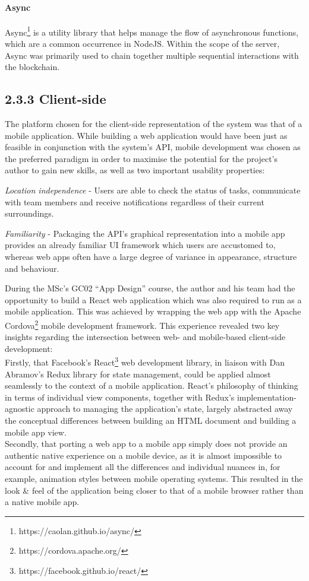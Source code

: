 \documentclass[12pt]{report}
\let\oldparagraph\paragraph
\renewcommand{\paragraph}[1]{\oldparagraph{#1}\mbox{}}
\begin{document}
\paragraph{Async}\label{async}

Async\footnote{https://caolan.github.io/async/} is a utility
library that helps manage the flow of asynchronous functions, which are
a common occurrence in NodeJS. Within the scope of the server, Async was
primarily used to chain together multiple sequential interactions with
the blockchain.

\subsection{2.3.3 Client-side}\label{client-side}

The platform chosen for the client-side representation of the system was
that of a mobile application. While building a web application would
have been just as feasible in conjunction with the system's API, mobile
development was chosen as the preferred paradigm in order to maximise
the potential for the project's author to gain new skills, as well as
two important usability properties:

\emph{Location independence} - Users are able to check the status of
tasks, communicate with team members and receive notifications
regardless of their current surroundings.

\emph{Familiarity} - Packaging the API's graphical representation into a
mobile app provides an already familiar UI framework which users are
accustomed to, whereas web apps often have a large degree of variance in
appearance, structure and behaviour.

During the MSc's GC02 ``App Design'' course, the author and his team had
the opportunity to build a React web application which was also required
to run as a mobile application. This was achieved by wrapping the web
app with the Apache Cordova\footnote{https://cordova.apache.org/}
mobile development framework. This experience revealed two key insights
regarding the intersection between web- and mobile-based client-side
development:\\
Firstly, that Facebook's
React\footnote{https://facebook.github.io/react/} web development
library, in liaison with Dan Abramov's
Redux\cite{1redux} library for state management,
could be applied almost seamlessly to the context of a mobile
application. React's philosophy of thinking in terms of individual view
components, together with Redux's implementation-agnostic approach to
managing the application's state, largely abstracted away the conceptual
differences between building an HTML document and building a mobile app
view.\\
Secondly, that porting a web app to a mobile app simply does not provide
an authentic native experience on a mobile device, as it is almost
impossible to account for and implement all the differences and
individual nuances in, for example, animation styles between mobile
operating systems. This resulted in the look \& feel of the application
being closer to that of a mobile browser rather than a native mobile
app.
\end{document}
